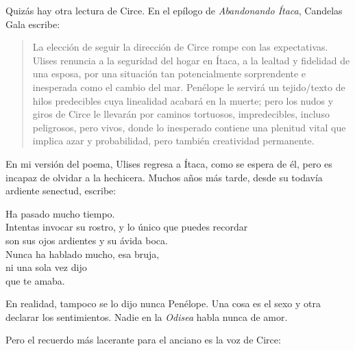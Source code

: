 Quizás hay otra lectura de Circe. En el epílogo de \emph{Abandonando Ítaca}, Candelas Gala escribe:

\begin{quotation}
La elección de seguir la dirección de Circe rompe con las expectativas. Ulises renuncia a la seguridad del hogar en Ítaca, a la lealtad y fidelidad de una esposa, por una situación tan potencialmente sorprendente e inesperada como el cambio del mar. Penélope le servirá un tejido/texto de hilos predecibles cuya linealidad acabará en la muerte; pero los nudos y giros de Circe le llevarán por caminos tortuosos, impredecibles, incluso peligrosos, pero vivos, donde lo inesperado contiene una plenitud vital que implica azar y probabilidad, pero también creatividad permanente.
\end{quotation}

En mi versión del poema, Ulises regresa a Ítaca, como se espera de él, pero es incapaz de olvidar a la hechicera. Muchos años más tarde, desde su todavía ardiente senectud, escribe:

\begin{versopropio}
Ha pasado mucho tiempo.\\
Intentas invocar su rostro, y lo único que puedes recordar\\
son sus ojos ardientes y su ávida boca.\\
Nunca ha hablado mucho, esa bruja,\\
ni una sola vez dijo\\
que te amaba.
\end{versopropio}

En realidad, tampoco se lo dijo nunca Penélope. Una cosa es el sexo y otra declarar los sentimientos. Nadie en la \emph{Odisea} habla nunca de amor.

Pero el recuerdo más lacerante para el anciano es la voz de Circe:

